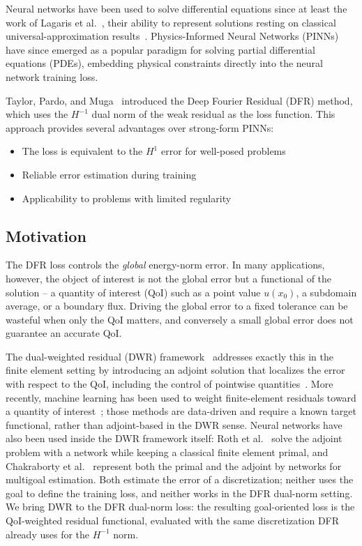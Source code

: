 \documentclass[preprint,11pt]{elsarticle}
\begin{document}
Neural networks have been used to solve differential equations since at least the work of Lagaris et al.~\citep{lagaris1998ann}, their ability to represent solutions resting on classical universal-approximation results~\citep{cybenko1989approximation}. Physics-Informed Neural Networks (PINNs)~\citep{raissi2019physics} have since emerged as a popular paradigm for solving partial differential equations (PDEs), embedding physical constraints directly into the neural network training loss.

Taylor, Pardo, and Muga~\citep{taylor2023deep} introduced the Deep Fourier Residual (DFR) method, which uses the $H^{-1}$ dual norm of the weak residual as the loss function. This approach provides several advantages over strong-form PINNs:
\begin{itemize}
    \item The loss is equivalent to the $H^1$ error for well-posed problems
    \item Reliable error estimation during training
    \item Applicability to problems with limited regularity
\end{itemize}

\subsection{Motivation}

The DFR loss controls the \emph{global} energy-norm error. In many applications, however, the object of interest is not the global error but a functional of the solution -- a quantity of interest (QoI) such as a point value $u(x_0)$, a subdomain average, or a boundary flux. Driving the global error to a fixed tolerance can be wasteful when only the QoI matters, and conversely a small global error does not guarantee an accurate QoI.

The dual-weighted residual (DWR) framework~\citep{becker2001optimal} addresses exactly this in the finite element setting by introducing an adjoint solution that localizes the error with respect to the QoI, including the control of pointwise quantities~\citep{prudhomme1999goal}. More recently, machine learning has been used to weight finite-element residuals toward a quantity of interest~\citep{brevis2021mlmres,brevis2022neuralcontrol}; those methods are data-driven and require a known target functional, rather than adjoint-based in the DWR sense. Neural networks have also been used inside the DWR framework itself: Roth et al.~\citep{roth2022neural} solve the adjoint problem with a network while keeping a classical finite element primal, and Chakraborty et al.~\citep{chakraborty2025multigoal} represent both the primal and the adjoint by networks for multigoal estimation. Both estimate the error of a discretization; neither uses the goal to define the training loss, and neither works in the DFR dual-norm setting. We bring DWR to the DFR dual-norm loss: the resulting goal-oriented loss is the QoI-weighted residual functional, evaluated with the same discretization DFR already uses for the $H^{-1}$ norm.
\end{document}
